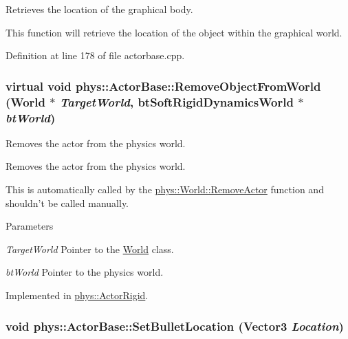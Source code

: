 Retrieves the location of the graphical body. 

This function will retrieve the location of the object within the graphical world. 

Definition at line 178 of file actorbase.cpp.

\hypertarget{classphys_1_1ActorBase_af669724f10d0bf74f4951c85caa42494}{
\subsubsection[{RemoveObjectFromWorld}]{\setlength{\rightskip}{0pt plus 5cm}virtual void phys::ActorBase::RemoveObjectFromWorld ({\bf World} $\ast$ {\em TargetWorld}, \/  btSoftRigidDynamicsWorld $\ast$ {\em btWorld})}}
\label{d8/d0f/classphys_1_1ActorBase_af669724f10d0bf74f4951c85caa42494}


Removes the actor from the physics world. 

Removes the actor from the physics world. \par
 This is automatically called by the \hyperlink{classphys_1_1World_ab00f84983afcc7f6ef1e5a84367d994d}{phys::World::RemoveActor} function and shouldn't be called manually. 
\begin{DoxyParams}{Parameters}
\item[{\em TargetWorld}]Pointer to the \hyperlink{classphys_1_1World}{World} class. \item[{\em btWorld}]Pointer to the physics world. \end{DoxyParams}


Implemented in \hyperlink{classphys_1_1ActorRigid_a74a4eaa5491b90a977e9db0457271f31}{phys::ActorRigid}.

\hypertarget{classphys_1_1ActorBase_aa7ab524d2905e640cea6324cce9ccfdb}{
\subsubsection[{SetBulletLocation}]{\setlength{\rightskip}{0pt plus 5cm}void phys::ActorBase::SetBulletLocation ({\bf Vector3} {\em Location})}}
\label{d8/d0f/classphys_1_1ActorBase_aa7ab524d2905e640cea6324cce9ccfdb}


